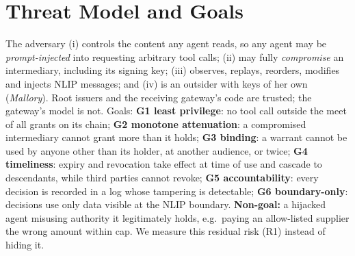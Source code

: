 \documentclass[sigconf,nonacm]{acmart}
\begin{document}
\section{Threat Model and Goals}
The adversary (i) controls the content any agent reads, so any agent may be \emph{prompt-injected} into requesting arbitrary tool calls; (ii) may fully \emph{compromise} an intermediary, including its signing key; (iii) observes, replays, reorders, modifies and injects NLIP messages; and (iv) is an outsider with keys of her own (\emph{Mallory}). Root issuers and the receiving gateway's code are trusted; the gateway's model is not.
Goals: \textbf{G1 least privilege}: no tool call outside the meet of all grants on its chain; \textbf{G2 monotone attenuation}: a compromised intermediary cannot grant more than it holds; \textbf{G3 binding}: a warrant cannot be used by anyone other than its holder, at another audience, or twice; \textbf{G4 timeliness}: expiry and revocation take effect at time of use and cascade to descendants, while third parties cannot revoke; \textbf{G5 accountability}: every decision is recorded in a log whose tampering is detectable; \textbf{G6 boundary-only}: decisions use only data visible at the NLIP boundary.
\textbf{Non-goal:} a hijacked agent misusing authority it legitimately holds, e.g.\ paying an allow-listed supplier the wrong amount within cap. We measure this residual risk (R1) instead of hiding it.
\end{document}

